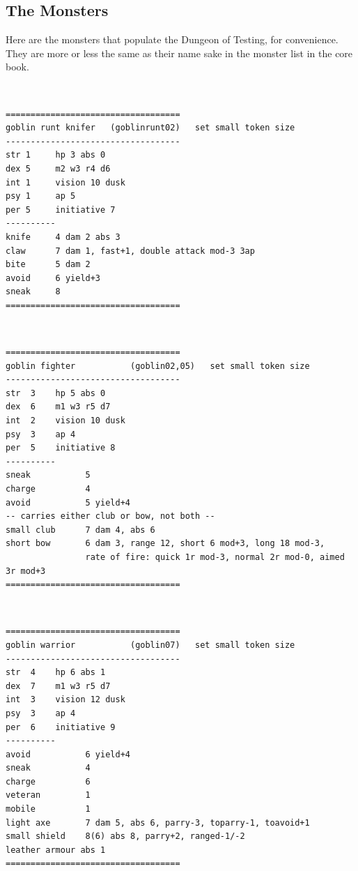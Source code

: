 


\subsection*{The Monsters}

Here are the monsters that populate the Dungeon of Testing, for convenience. They are more or less the same as their name sake in the monster list in the core book.

\

\goodbreak \begin{samepage} \small \begin{verbatim}
===================================
goblin runt knifer   (goblinrunt02)   set small token size
-----------------------------------
str 1     hp 3 abs 0
dex 5     m2 w3 r4 d6
int 1     vision 10 dusk
psy 1     ap 5
per 5     initiative 7
----------
knife     4 dam 2 abs 3
claw      7 dam 1, fast+1, double attack mod-3 3ap
bite      5 dam 2
avoid     6 yield+3
sneak     8
===================================
\end{verbatim} \normalsize \end{samepage}

\

\goodbreak \begin{samepage} \small \begin{verbatim}
===================================
goblin fighter           (goblin02,05)   set small token size
-----------------------------------
str  3    hp 5 abs 0
dex  6    m1 w3 r5 d7
int  2    vision 10 dusk
psy  3    ap 4
per  5    initiative 8
----------
sneak           5
charge          4
avoid           5 yield+4
-- carries either club or bow, not both --
small club      7 dam 4, abs 6
short bow       6 dam 3, range 12, short 6 mod+3, long 18 mod-3,
                rate of fire: quick 1r mod-3, normal 2r mod-0, aimed 3r mod+3
===================================
\end{verbatim} \normalsize \end{samepage}

\

\goodbreak \begin{samepage} \small \begin{verbatim}
===================================
goblin warrior           (goblin07)   set small token size
-----------------------------------
str  4    hp 6 abs 1
dex  7    m1 w3 r5 d7
int  3    vision 12 dusk
psy  3    ap 4
per  6    initiative 9
----------
avoid           6 yield+4
sneak           4
charge          6
veteran         1
mobile          1
light axe       7 dam 5, abs 6, parry-3, toparry-1, toavoid+1
small shield    8(6) abs 8, parry+2, ranged-1/-2
leather armour abs 1
===================================
\end{verbatim} \normalsize \end{samepage}

